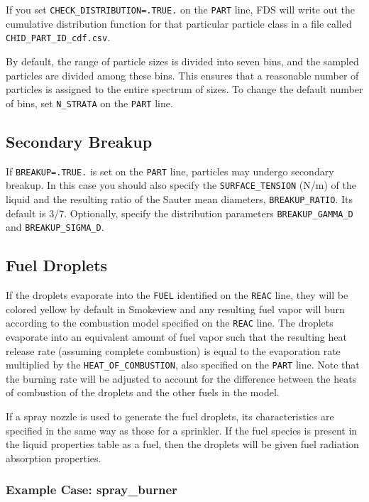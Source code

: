 \documentclass[11pt]{book}
\newcommand{\ct}{\tt\small}
\begin{document}
If you set {\ct CHECK\_DISTRIBUTION=.TRUE.} on the {\ct PART} line, FDS will write out the cumulative distribution function for that particular particle class in a file called {\ct CHID\_PART\_ID\_cdf.csv}.

By default, the range of particle sizes is divided into seven bins, and the sampled particles are divided among these bins. This ensures that a reasonable number of particles is assigned to the entire spectrum of sizes. To change the default number of bins, set {\ct N\_STRATA} on the {\ct PART} line.


\subsection{Secondary Breakup}
\label{info:secondary_breakup}

If {\ct BREAKUP=.TRUE.} is set on the {\ct PART} line, particles may undergo secondary breakup.
In this case you should also specify the {\ct SURFACE\_TENSION} (N/m) of the liquid and the resulting ratio of the Sauter mean diameters,
{\ct BREAKUP\_RATIO}. Its default is 3/7. Optionally, specify the distribution parameters {\ct BREAKUP\_GAMMA\_D} and {\ct BREAKUP\_SIGMA\_D}.


\subsection{Fuel Droplets}
\label{info:fuel_droplets}

If the droplets evaporate into the {\ct FUEL} identified on the {\ct REAC} line, they will be colored yellow by default in Smokeview and any resulting
fuel vapor will burn according to the combustion model specified on the {\ct REAC} line.
The droplets evaporate into an equivalent amount of fuel vapor such that the resulting heat release rate
(assuming complete combustion) is equal to the evaporation rate multiplied by the {\ct HEAT\_OF\_COMBUSTION}, also specified on the {\ct PART} line. Note that the
burning rate will be adjusted to account for the difference between the heats of combustion of the droplets and the other fuels in the model.

If a spray nozzle is used to generate the fuel droplets, its characteristics are specified
in the same way as those for a sprinkler.  If the fuel species is present in the liquid properties table as a fuel, then the droplets will be given fuel radiation absorption properties.

\subsubsection{Example Case: spray\_burner}
\end{document}
